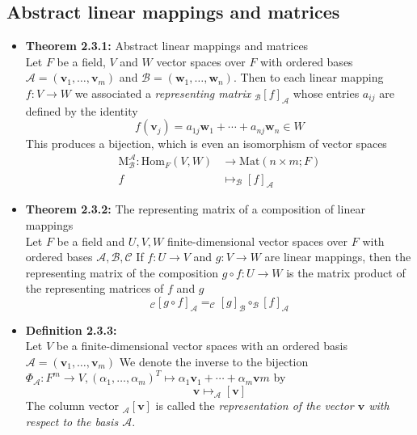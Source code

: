 \documentclass[11pt,a4paper]{article}
\begin{document}
\subsection{Abstract linear mappings and matrices}

\begin{itemize}

    \item \textbf{Theorem 2.3.1:} Abstract linear mappings and matrices \\
        Let $F$ be a field, $V$ and $W$ vector spaces over $F$ with ordered bases
        $\mathcal{A} = (\textbf{v}_1, \ldots, \textbf{v}_m)$ and
        $\mathcal{B} = (\textbf{w}_1, \ldots, \textbf{w}_n)$.
        Then to each linear mapping $f : V \to W$ we associated a \emph{representing matrix}
        $_\mathcal{B}{[f]}_\mathcal{A}$ whose entries $a_{ij}$ are defined by the identity
        \[
            f(\textbf{v}_j) = a_{1j}\textbf{w}_1 + \cdots + a_{nj}\textbf{w}_n \in W
        \]
        This produces a bijection, which is even an isomorphism of vector spaces
        \begin{align*}{}
            \mathrm{M}_\mathcal{B}^\mathcal{A} : \mathrm{Hom}_F(V,W) &\to
            \mathrm{Mat}(n \times m; F) \\
            f &\mapsto _\mathcal{B}{[f]}_\mathcal{A}
        \end{align*}

    \item \textbf{Theorem 2.3.2:} The representing matrix of a composition of linear mappings \\
        Let $F$ be a field and $U, V, W$ finite-dimensional vector spaces over $F$ with ordered
        bases $\mathcal{A, B, C}$
        If $f : U \to V$ and $g : V \to W$ are linear mappings,
        then the representing  matrix of the composition
        $g \circ f : U \to W$
        is the matrix product of the representing matrices of $f$ and $g$
        \[
            _\mathcal{C}{[g \circ f]}_\mathcal{A} = _\mathcal{C}{[g]}_\mathcal{B} \circ
            _\mathcal{B}{[f]}_\mathcal{A}
        \]

    \item \textbf{Definition 2.3.3:} \\
        Let $V$ be a finite-dimensional vector spaces with an ordered basis
        $\mathcal{A} = (\textbf{v}_1, \ldots, \textbf{v}_m)$
        We denote the inverse to the bijection
        $\Phi_\mathcal{A} : F^m \to V, {(\alpha_1, \ldots, \alpha_m)}^T \mapsto
        \alpha_1\textbf{v}_1 + \cdots + \alpha_m\textbf{v}m$ by
        \[
            \textbf{v} \mapsto _\mathcal{A}[\textbf{v}]
        \]
        The column vector $_\mathcal{A}[\textbf{v}]$ is called the \emph{representation of the
        vector $\textbf{v}$ with respect to the basis $\mathcal{A}$}.


\end{itemize}
\end{document}
